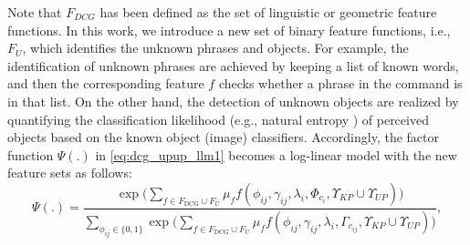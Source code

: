 Note that $F_{DCG}$ has been defined as the set of linguistic or geometric feature functions. In this work, we introduce a new set of binary feature functions, i.e., $F_U$, which identifies the unknown phrases and objects. For example, the identification of unknown phrases are achieved by keeping a list of known words, and then the corresponding feature $f$ checks whether a phrase in the command is in that list. On the other hand, the detection of unknown objects are realized by quantifying the classification likelihood (e.g., natural entropy \cite{grimmett2013}) of perceived objects based on the known object (image) classifiers. Accordingly, the factor function $\Psi(.)$ in \eqref{eq:dcg_upup_llm1} becomes a log-linear model with the new feature sets as follows: %
\begin{equation}
\Psi(.) = \frac{\exp \Big( \sum\limits_{f \in F_{\text{DCG}} \cup F_U} \mu_f f(\phi_{ij},\gamma_{ij},\lambda_i,\Phi_{c_{i}},\Upsilon_{KP} \cup \Upsilon_{UP}) \Big)}{\sum\limits_{\phi_{ij} \in \{0,1\}}\exp \Big( \sum\limits_{f \in F_{\text{DCG}} \cup F_U} \mu_f f(\phi_{ij},\gamma_{ij},\lambda_i,\Gamma_{c_{ij}},\Upsilon_{KP} \cup \Upsilon_{UP}) \Big)},
\label{eq:dcg_upup_llm2}
\end{equation}

